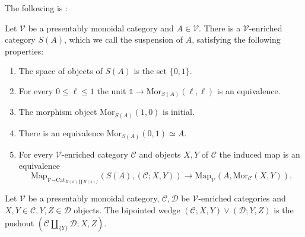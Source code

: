 \documentclass[10pt,oneside]{article}
\numberwithin{equation}{section} %
\numberwithin{figure}{section} %
\theoremstyle{plain}
\theoremstyle{definition}
\newcommand{\mC}{{\mathcal C}}
\newcommand{\mD}{{\mathcal D}}
\newcommand{\mV}{{\mathcal V}}
\newcommand{\A}{A}
\newcommand{\X}{X}
\newcommand{\Y}{Y}
\newcommand{\Cat}{\mathrm{Cat}}
\newcommand{\tu}{{\mathbb 1}}
\newcommand{\Map}{{\mathrm{Map}}}
\newcommand{\Mor}{{\mathrm{Mor}}}
\begin{document}
The following is \cite[Corollary 2.2.2]{GepnerHeine2026}:

\begin{corollary}\label{susp}

Let $\mV$ be a presentably monoidal category and $\A \in \mV$.
There is a $\mV$-enriched category $S(\A) $, which we call the suspension of $A$, satisfying the following properties:
\begin{enumerate}[\normalfont(1)]\setlength{\itemsep}{-2pt}
\item The space of objects of $S(\A) $ is the set $\{0,1\}.$

\item For every $0 \leq \ell \leq 1$ the unit $\tu \to \Mor_{S(\A)}(\ell,\ell)$ is an equivalence.

\item The morphism object $\Mor_{S(\A)}(1,0)$ is initial.

\item There is an equivalence $ \Mor_{S(\A)}(0,1) \simeq \A$. 

\item For every $\mV$-enriched category $\mC $ and objects $\X,\Y$ of $\mC$
the induced map is an equivalence $$ \Map_{\mV\mathrm{-}\Cat_{B(\tu) \coprod B(\tu)/}}(S(\A), (\mC; \X,\Y)) \to \Map_\mV(\A, \Mor_\mC(\X,\Y)).$$
\end{enumerate}
    
\end{corollary}

\begin{definition}
Let $\mV$ be a presentably monoidal category, $\mC, \mD$ be $\mV$-enriched categories and $X,Y \in \mC, Y,Z \in \mD$
objects. The bipointed wedge $(\mC; X,Y) \vee (\mD; Y,Z) $
is the pushout $ (\mC \coprod_{\{Y\}} \mD; X,Z).$
    
\end{definition}
\end{document}
